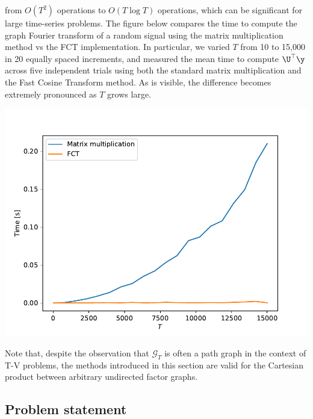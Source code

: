{    from $O(T^2)$ operations to $O(T \log T)$ operations, which can be significant for large time-series problems. The figure below compares the time to compute the graph Fourier transform of a random signal using the matrix multiplication method vs the FCT implementation. In particular, we varied $T$ from 10 to 15,000 in 20 equally spaced increments, and measured the mean time to compute $\U^\top \y$ across five independent trials using both the standard matrix multiplication and the Fast Cosine Transform method. As is visible, the difference becomes extremely pronounced as $T$ grows large.

    \begin{center}
        \includegraphics[width=\linewidth]{Figures/DCT.pdf}
    \end{center}



}



Note that, despite the observation that $\mathcal{G}_T$ is often a path graph in the context of T-V problems, the methods introduced in this section are valid for the Cartesian product between arbitrary undirected factor graphs.

\subsection{Problem statement}


